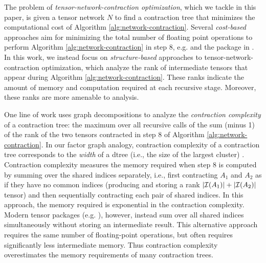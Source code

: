 The problem of \emph{tensor-network-contraction optimization}, which we tackle in this paper, is given a tensor network $N$ to find a contraction tree that minimizes the computational cost of Algorithm \ref{alg:network-contraction}. %
Several \emph{cost-based} approaches aim for minimizing the total number of floating point operations to perform Algorithm \ref{alg:network-contraction} in step 8, e.g. \cite{PHV14} and the  package in .  %
In this work, we instead focus on \emph{structure-based} approaches to tensor-network-contraction optimization, which analyze the rank of intermediate tensors that appear during Algorithm \ref{alg:network-contraction}. These ranks indicate the amount of memory and computation required at each recursive stage. Moreover, these ranks are more amenable to analysis.

One line of work \cite{MS08,DFGHSW18} uses graph decompositions to analyze the \emph{contraction complexity} of a contraction tree: the maximum over all recursive calls of the sum (minus 1) of the rank of the two tensors contracted in step 8 of Algorithm \ref{alg:network-contraction}. In our factor graph analogy, contraction complexity of a contraction tree corresponds to the \emph{width} of a dtree (i.e., the size of the largest cluster) \cite{darwiche01b}. Contraction complexity measures the memory required when step 8 is computed
by summing over the shared indices separately, i.e., first contracting $A_1$ and $A_2$ as if they have no common indices (producing and storing a rank $|\mathcal{I}(A_1)|+|\mathcal{I}(A_2)|$ tensor) and then sequentially contracting each pair of shared indices. In this approach, the memory required is exponential in the contraction complexity. Modern tensor packages (e.g. ), however, instead sum over all shared indices simultaneously without storing an intermediate result. This alternative approach requires the same number of floating-point operations, but often requires significantly less intermediate memory. Thus contraction complexity overestimates the memory requirements of many contraction trees. 

